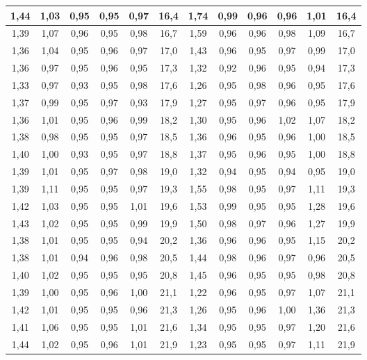 \begin{table}[H]
\begin{center}
{\begin{tabular}{| c | c | c | c | c | c | c | c | c | c | c | c |}
\hline
1,44 &	1,03 &	0,95 &	0,95 &	0,97 &	16,4 & 1,74 & 0,99 & 0,96 & 0,96 & 1,01 & 16,4\\
\hline
1,39 &	1,07 &	0,96 &	0,95 &	0,98 &	16,7 & 1,59 & 0,96 & 0,96 & 0,98 & 1,09 & 16,7\\
\hline
1,36 &	1,04 &	0,95 &	0,96 &	0,97 &	17,0 & 1,43 & 0,96 & 0,95 & 0,97 & 0,99 & 17,0\\
\hline
1,36 &	0,97 &	0,95 &	0,96 &	0,95 &	17,3 & 1,32 & 0,92 & 0,96 & 0,95 & 0,94 & 17,3\\
\hline
1,33 &	0,97 &	0,93 &	0,95 &	0,98 &	17,6 & 1,26 & 0,95 & 0,98 & 0,96 & 0,95 & 17,6\\
\hline
1,37 &	0,99 &	0,95 &	0,97 &	0,93 &	17,9 & 1,27 & 0,95 & 0,97 & 0,96 & 0,95 & 17,9\\
\hline
1,36 &	1,01 &	0,95 &	0,96 &	0,99 &	18,2 & 1,30 & 0,95 & 0,96 & 1,02 & 1,07 & 18,2\\
\hline
1,38 &	0,98 &	0,95 &	0,95 &	0,97 &	18,5 & 1,36 & 0,96 & 0,95 & 0,96 & 1,00 & 18,5\\
\hline
1,40 &	1,00 &	0,93 &	0,95 &	0,97 &	18,8 & 1,37 & 0,95 & 0,96 & 0,95 & 1,00 & 18,8\\
\hline
1,39 &	1,01 &	0,95 &	0,97 &	0,98 &	19,0 & 1,32 & 0,94 & 0,95 & 0,94 & 0,95 & 19,0\\
\hline
1,39 &	1,11 &	0,95 &	0,95 &	0,97 &	19,3 & 1,55 & 0,98 & 0,95 & 0,97 & 1,11 & 19,3\\
\hline
1,42 &	1,03 &	0,95 &	0,95 &	1,01 &	19,6 & 1,53 & 0,99 & 0,95 & 0,95 & 1,28 & 19,6\\
\hline
1,43 &	1,02 &	0,95 &	0,95 &	0,99 &	19,9 & 1,50 & 0,98 & 0,97 & 0,96 & 1,27 & 19,9\\
\hline
1,38 &	1,01 &	0,95 &	0,95 &	0,94 &	20,2 & 1,36 & 0,96 & 0,96 & 0,95 & 1,15 & 20,2\\
\hline
1,38 &	1,01 &	0,94 &	0,96 &	0,98 &	20,5 & 1,44 & 0,98 & 0,96 & 0,97 & 0,96 & 20,5\\
\hline
1,40 &	1,02 &	0,95 &	0,95 &	0,95 &	20,8 & 1,45 & 0,96 & 0,95 & 0,95 & 0,98 & 20,8\\
\hline
1,39 &	1,00 &	0,95 &	0,96 &	1,00 &	21,1 & 1,22 & 0,96 & 0,95 & 0,97 & 1,07 & 21,1\\
\hline
1,42 &	1,01 &	0,95 &	0,95 &	0,96 &	21,3 & 1,26 & 0,95 & 0,96 & 1,00 & 1,36 & 21,3\\
\hline
1,41 &	1,06 &	0,95 &	0,95 &	1,01 &	21,6 & 1,34 & 0,95 & 0,95 & 0,97 & 1,20 & 21,6\\
\hline
1,44 &	1,02 &	0,95 &	0,96 &	1,01 &	21,9 & 1,23 & 0,95 & 0,95 & 0,97 & 1,11 & 21,9\\

\end{tabular}}
\end{center}
\end{table}
